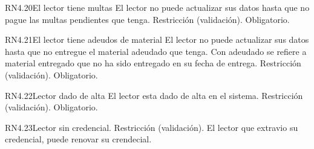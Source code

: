 
\begin{BussinesRule}{RN4.20}{El lector tiene multas} 
	\BRitem[Descripción:] El lector no puede actualizar sus datos hasta que no pague las multas pendientes que tenga.
	\BRitem[Tipo:] Restricción (validación).
	\BRitem[Nivel:] Obligatorio.
\end{BussinesRule}


\begin{BussinesRule}{RN4.21}{El lector tiene adeudos de material} 
	\BRitem[Descripción:] El lector no puede actualizar sus datos hasta que no entregue el material adeudado que tenga. Con adeudado se refiere a material entregado que no ha sido entregado en su fecha de entrega.
	\BRitem[Tipo:] Restricción (validación).
	\BRitem[Nivel:] Obligatorio.
\end{BussinesRule}


\begin{BussinesRule}{RN4.22}{Lector dado de alta} 
	\BRitem[Descripción:] El lector esta dado de alta en el sistema.
	\BRitem[Tipo:] Restricción (validación).
	\BRitem[Nivel:] Obligatorio.
\end{BussinesRule}


\begin{BussinesRule}{RN4.23}{Lector sin credencial.}
	\BRitem[Tipo:] Restricción (validación).
	\BRitem[Descripción:] El lector que extravio su credencial, puede renovar su crendecial.
\end{BussinesRule}


